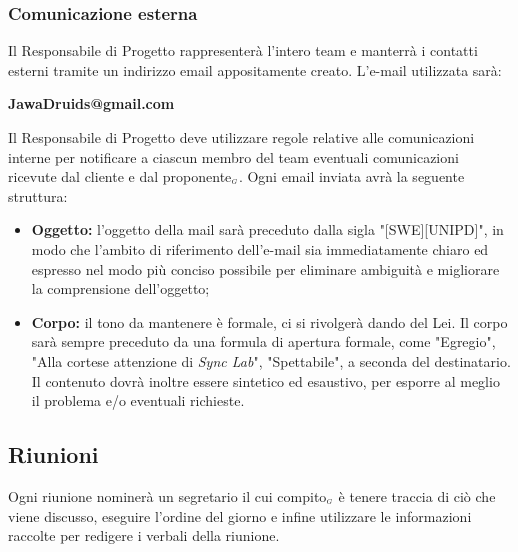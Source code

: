 \subsubsection{Comunicazione esterna}\label{ProcessiOrganizzativiProcessoDiCoordinamentoComunicazioneEsterna}
Il Responsabile di Progetto rappresenterà l'intero team e manterrà i contatti esterni tramite un indirizzo email appositamente creato.
L'e-mail utilizzata sarà: 
\begin{center}
	\textbf {JawaDruids@gmail.com}
\end{center}
Il Responsabile di Progetto deve utilizzare regole relative alle comunicazioni interne per notificare a ciascun membro del team eventuali comunicazioni ricevute dal cliente e dal proponente$_{\scaleto{G}{3pt}}$.
Ogni email inviata avrà la seguente struttura:
\begin{itemize}
\item \textbf{Oggetto:} l'oggetto della mail sarà preceduto dalla sigla "[SWE][UNIPD]", in modo che l'ambito di riferimento dell'e-mail sia immediatamente chiaro ed espresso nel modo più conciso possibile per eliminare ambiguità e migliorare la comprensione dell'oggetto;
	\item \textbf{Corpo:} il tono da mantenere è formale, ci si rivolgerà dando del Lei. Il corpo sarà sempre preceduto da una formula di apertura formale, come "Egregio", "Alla cortese attenzione di \textit{Sync Lab}", "Spettabile", a seconda del destinatario.
	Il contenuto dovrà inoltre essere sintetico ed esaustivo, per esporre al meglio il problema e/o eventuali richieste.
\end{itemize}
\subsection{Riunioni}\label{ProcessiOrganizzativiProcessoDiCoordinamentoRiunioni}
Ogni riunione nominerà un segretario il cui compito$_{\scaleto{G}{3pt}}$ è tenere traccia di ciò che viene discusso, eseguire l'ordine del giorno e infine utilizzare le informazioni raccolte per redigere i verbali della riunione.
